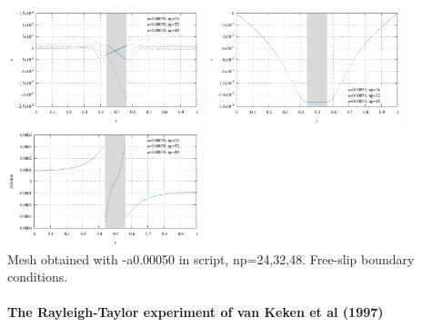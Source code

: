 \begin{center}
\includegraphics[width=5.7cm]{python_codes/fieldstone_93/results_exp3/u}
\includegraphics[width=5.7cm]{python_codes/fieldstone_93/results_exp3/v}
\includegraphics[width=5.7cm]{python_codes/fieldstone_93/results_exp3/pressure}\\
{\captionfont  Mesh obtained with -a0.00050 in script, np=24,32,48. Free-slip boundary conditions.}
\end{center}

\newpage
\paragraph{The Rayleigh-Taylor experiment of van Keken et al (1997) \cite{vaks97}}

